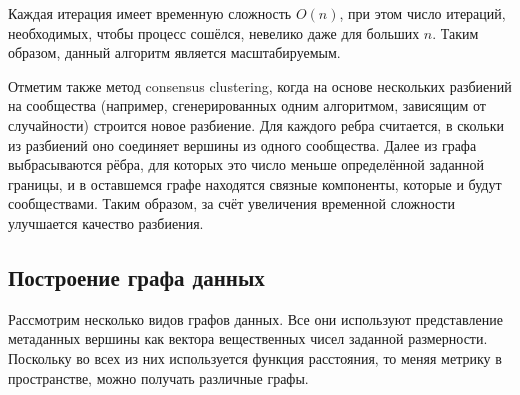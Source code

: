 \documentclass{article}
\begin{document}
Каждая итерация имеет временную сложность $O(n)$, при этом число итераций, необходимых, чтобы процесс сошёлся, невелико даже для больших $n$. Таким образом, данный алгоритм является масштабируемым.

Отметим также метод consensus clustering, когда на основе нескольких разбиений на сообщества (например, сгенерированных одним алгоритмом, зависящим от случайности) строится новое разбиение. Для каждого ребра считается, в скольки из разбиений оно соединяет вершины из одного сообщества. Далее из графа выбрасываются рёбра, для которых это число меньше определённой заданной границы, и в оставшемся графе находятся связные компоненты, которые и будут сообществами. Таким образом, за счёт увеличения временной сложности улучшается качество разбиения.

\subsection*{Построение графа данных}

Рассмотрим несколько видов графов данных. Все они используют представление метаданных вершины как вектора вещественных чисел заданной размерности. Поскольку во всех из них используется функция расстояния, то меняя метрику в пространстве, можно получать различные графы.
\end{document}

